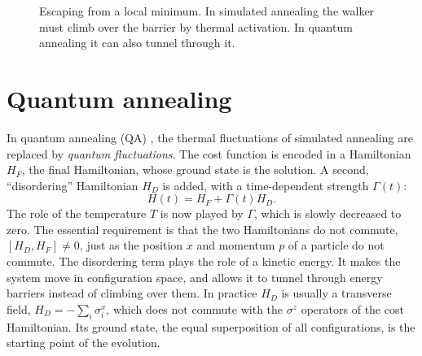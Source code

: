 \begin{figure}[h]\centering
{}
\caption{Escaping from a local minimum. In simulated annealing the walker must climb over the barrier by thermal activation. In quantum annealing it can also tunnel through it.}\label{fig:annealing}
\end{figure}

\section{Quantum annealing}
In quantum annealing (QA) \cite{Kadowaki1998}, the thermal fluctuations of simulated annealing are replaced by \emph{quantum fluctuations}. The cost function is encoded in a Hamiltonian $H_F$, the final Hamiltonian, whose
ground state is the solution. A second, ``disordering'' Hamiltonian $H_D$ is added, with a time-dependent strength $\Gamma(t)$:
\begin{equation}
  H(t)=H_F+\Gamma(t)H_D .
\end{equation}
The role of the temperature $T$ is now played by $\Gamma$, which is slowly decreased to zero. The essential requirement is that the two Hamiltonians do not commute, $[H_D,H_F]\neq0$, just as the position $x$ and momentum $p$
of a particle do not commute. The disordering term plays the role of a kinetic energy. It makes the system move in configuration space, and allows it to tunnel through energy barriers instead of climbing over them.
In practice $H_D$ is usually a transverse field, $H_D=-\sum_i\sigma^x_i$, which does not commute with the $\sigma^z$ operators of the cost Hamiltonian. Its ground state, the equal superposition of all configurations, is
the starting point of the evolution.

